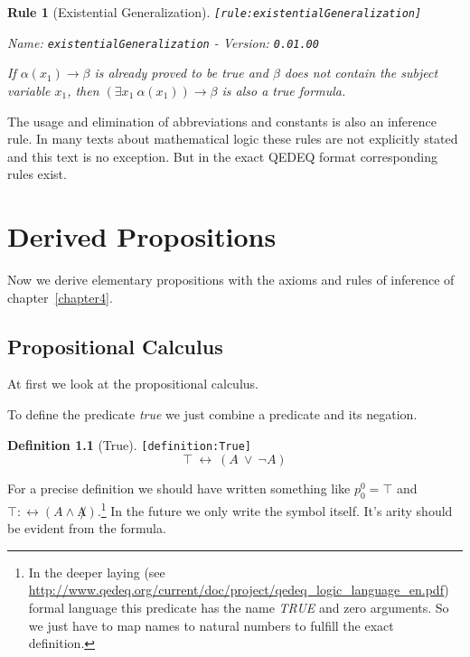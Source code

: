 \documentclass[a4paper,german,10pt,twoside]{book}
\newtheorem{rul}{Rule}
\theoremstyle{definition}
\newtheorem{defn}{Definition}
\theoremstyle{remark}
\begin{document}
\begin{rul}[Existential Generalization]
\label{rule:existentialGeneralization} \hypertarget{rule:existentialGeneralization}{}
{\tt \tiny [\verb]rule:existentialGeneralization]]}

\par
{\em   Name: \verb]existentialGeneralization]  -  Version: \verb]0.01.00]}


If $\alpha(x_1) \rightarrow \beta$ is already proved to be true and $\beta$ does not contain the subject variable $x_1$, then $(\exists x_1~\alpha(x_1)) \rightarrow \beta$ is also a true formula.
\end{rul}


The usage and elimination of abbreviations and constants is also an inference rule. In many texts about mathematical logic these rules are not explicitly stated and this text is no exception. But in the exact QEDEQ format corresponding rules exist.




\chapter{Derived Propositions} \label{chapter6} \hypertarget{chapter6}{}

Now we derive elementary propositions with the axioms and rules of inference of chapter~\ref{chapter4}.

\section{Propositional Calculus} \label{chapter6_section1} \hypertarget{chapter6_section1}{}
At first we look at the propositional calculus.

\par
To define the predicate \emph{true} we just combine a predicate and its negation.

\begin{defn}[True]
\label{definition:True} \hypertarget{definition:True}{}
{\tt \tiny [\verb]definition:True]]}
$$\top\ \leftrightarrow\ (A\ \lor\ \neg A)$$

\end{defn}

For a precise definition we should have written something like $p^0_0 = \top$ and $\top :\leftrightarrow (A \wedge \not A)$.\footnote{In the deeper laying (see  \url{http://www.qedeq.org/current/doc/project/qedeq_logic_language_en.pdf}) formal language this predicate has the name \emph{TRUE} and zero arguments. So we just have to map names to natural numbers to fulfill the exact definition.} In the future we only write the symbol itself. It's arity should be evident from the formula.
\end{document}
